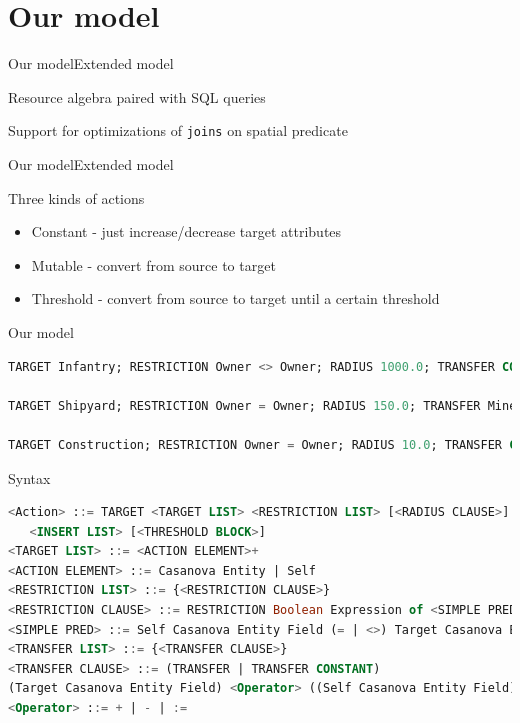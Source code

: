 \documentclass{beamer}
\begin{document}
\section{Our model}
\begin{slide}{Our model}{Extended model}{
\item Resource algebra paired with SQL queries
\item Support for optimizations of \texttt{joins} on spatial predicate
}\end{slide}

\begin{slide}{Our model}{Extended model}{
\item Three kinds of actions
\begin{itemize}
\item Constant - just increase/decrease target attributes
\item Mutable - convert from source to target
\item Threshold - convert from source to target until a certain threshold
\end{itemize}
}\end{slide}

\begin{frame}[fragile]{Our model}
\begin{lstlisting}[language=sql]
TARGET Infantry; RESTRICTION Owner <> Owner; RADIUS 1000.0; TRANSFER CONSTANT Life - ArrowDamage;

TARGET Shipyard; RESTRICTION Owner = Owner; RADIUS 150.0; TRANSFER MineralStash + Minerals;

TARGET Construction; RESTRICTION Owner = Owner; RADIUS 10.0; TRANSFER CONSTANT Integrity + 1.0; THRESHOLD Integrity = 100.0; OUTPUT Completed := true
\end{lstlisting}
\end{frame}

\begin{frame}[fragile]{Syntax}
\begin{lstlisting}[language=sql]
<Action> ::= TARGET <TARGET LIST> <RESTRICTION LIST> [<RADIUS CLAUSE>] <TRANSFER LIST>
   <INSERT LIST> [<THRESHOLD BLOCK>]
<TARGET LIST> ::= <ACTION ELEMENT>+
<ACTION ELEMENT> ::= Casanova Entity | Self
<RESTRICTION LIST> ::= {<RESTRICTION CLAUSE>}
<RESTRICTION CLAUSE> ::= RESTRICTION Boolean Expression of <SIMPLE PRED>
<SIMPLE PRED> ::= Self Casanova Entity Field (= | <>) Target Casanova Entity Field
<TRANSFER LIST> ::= {<TRANSFER CLAUSE>}
<TRANSFER CLAUSE> ::= (TRANSFER | TRANSFER CONSTANT)
(Target Casanova Entity Field) <Operator> ((Self Casanova Entity Field) | (Field Val)) [* Float Val]
<Operator> ::= + | - | :=
\end{lstlisting}
\end{frame}
\end{document}
